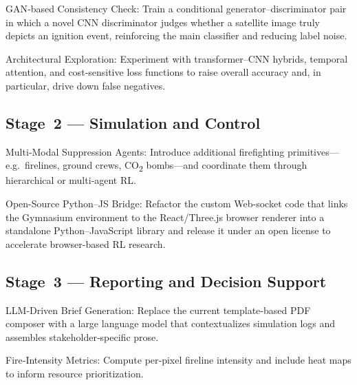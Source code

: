\documentclass[conference]{IEEEtran}
\begin{document}

GAN‐based Consistency Check: Train a conditional generator–discriminator pair in which a novel CNN discriminator judges whether a satellite image truly depicts an ignition event, reinforcing the main classifier and reducing label noise.

Architectural Exploration: Experiment with transformer–CNN hybrids, temporal attention, and cost‐sensitive loss functions to raise overall accuracy and, in particular, drive down false negatives.

\subsection{Stage~2 — Simulation and Control}



Multi‐Modal Suppression Agents: Introduce additional firefighting primitives—e.g.\ firelines, ground crews, \hbox{CO\textsubscript{$2$}} bombs—and coordinate them through hierarchical or multi‐agent RL.

Open-Source Python–JS Bridge: Refactor the custom Web-socket code that links the Gymnasium environment to the React/Three.js browser renderer into a standalone Python–JavaScript library and release it under an open license to accelerate browser-based RL research.

\subsection{Stage~3 — Reporting and Decision Support}

LLM‐Driven Brief Generation: Replace the current template‐based PDF composer with a large language model that contextualizes simulation logs and assembles stakeholder‐specific prose.

Fire‐Intensity Metrics: Compute per‐pixel fireline intensity and include heat maps to inform resource prioritization.
\end{document}
